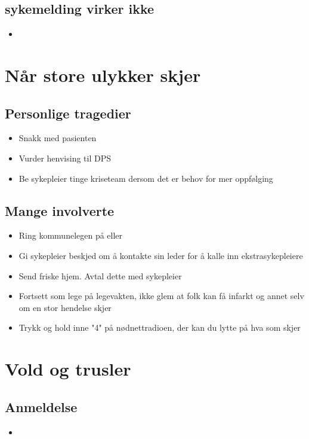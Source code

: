 \begin{itemize}
	\section{sykemelding virker ikke}%
		\begin{itemize}
			\item
		\end{itemize}

\newpage
\chapter{Når store ulykker skjer}
	\section{Personlige tragedier}
		\begin{itemize}
			\item Snakk med pasienten
			\item Vurder henvising til DPS
			\item Be sykepleier tinge kriseteam dersom det er behov for mer oppfølging
		\end{itemize}
	\section{Mange involverte}
		\begin{itemize}
			\item Ring kommunelegen på \pawmob{} eller \ebmob{}
			\item Gi sykepleier beskjed om å kontakte sin leder for å kalle inn ekstrasykepleiere
			\item Send friske hjem. Avtal dette med sykepleier
			\item Fortsett som lege på legevakten, ikke glem at folk kan få infarkt og annet selv om en stor hendelse skjer
			\item Trykk og hold inne "4" på nødnettradioen, der kan du lytte på hva som skjer
		\end{itemize}

\newpage
\chapter{Vold og trusler}
	\section{Anmeldelse}
		\begin{itemize}
			\item
		\end{itemize}

\end{itemize}

